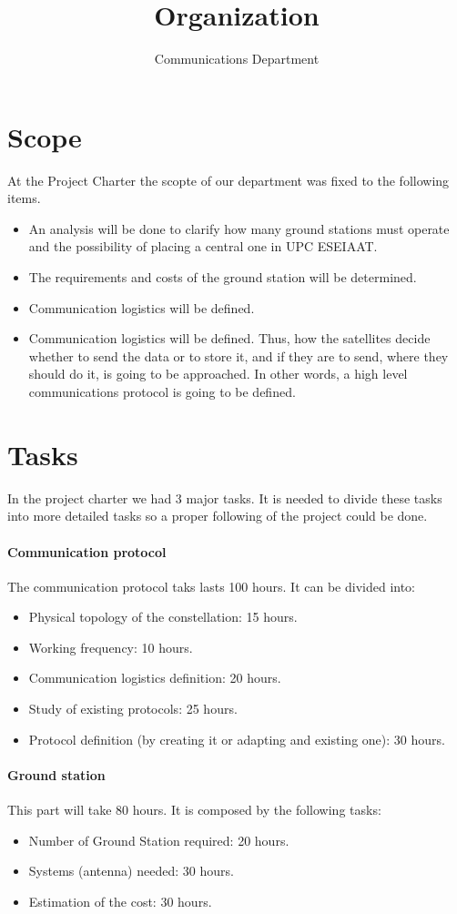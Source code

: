 \documentclass[12pt,a4paper]{article}
\author{Communications Department}
\title{Organization}
\begin{document}
\maketitle
\section{Scope}
At the Project Charter the scopte of our department was fixed to the following items.
\begin{itemize}
\item An analysis will be done to clarify how many ground stations must operate and the possibility of placing a central one in UPC ESEIAAT.
\item The requirements and costs of the ground station will be determined. 
\item Communication logistics will be defined.
\item Communication logistics will be defined. Thus, how the satellites decide whether to send the data or to store it, and if they are to send, where they should do it, is going to be approached. In other words, a high level communications protocol is going to be defined. 
\end{itemize}
\section{Tasks}
In the project charter we had 3 major tasks. It is needed to divide these tasks into more detailed tasks so a proper following of the project could be done. 
\paragraph{Communication protocol}
The communication protocol taks lasts 100 hours. It can be divided into: 
\begin{itemize}
\item Physical topology of the constellation: 15 hours.
\item Working frequency: 10 hours.
\item Communication logistics definition: 20 hours.
\item Study of existing protocols: 25 hours.
\item Protocol definition (by creating it or adapting and existing one): 30 hours.
\end{itemize}
\paragraph{Ground station}
This part will take 80 hours. It is composed by the following tasks:
\begin{itemize}
\item Number of Ground Station required: 20 hours.
\item Systems (antenna) needed: 30 hours.
\item Estimation of the cost: 30 hours.
\end{itemize}
\end{document}
